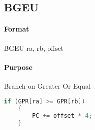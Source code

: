 \subsection{BGEU}


\paragraph{Format} BGEU ra, rb, offset

\paragraph{Purpose} Branch on Greater Or Equal

\begin{lstlisting}[language=c]
    if (GPR[ra] >= GPR[rb])
    {
        PC += offset * 4;
    }
\end{lstlisting}
